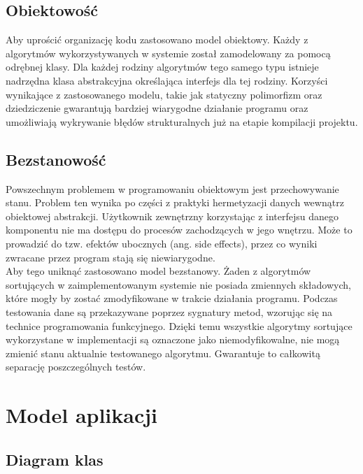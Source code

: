 \subsection{Obiektowość}
Aby uprościć organizację kodu zastosowano model obiektowy. Każdy z algorytmów wykorzystywanych w systemie
został zamodelowany za pomocą odrębnej klasy. Dla każdej rodziny algorytmów tego samego typu istnieje
nadrzędna klasa abstrakcyjna określająca interfejs dla tej rodziny. Korzyści wynikające z zastosowanego
modelu, takie jak statyczny polimorfizm oraz dziedziczenie gwarantują bardziej wiarygodne działanie programu
oraz umożliwiają wykrywanie błędów strukturalnych już na etapie kompilacji projektu.

\subsection{Bezstanowość}
Powszechnym problemem w programowaniu obiektowym jest przechowywanie stanu. Problem ten wynika po części
z praktyki hermetyzacji danych wewnątrz obiektowej abstrakcji. Użytkownik zewnętrzny korzystając z interfejsu
danego komponentu nie ma dostępu do procesów zachodzących w jego wnętrzu. Może to prowadzić do tzw. efektów
ubocznych (ang. side effects), przez co wyniki zwracane przez program stają się niewiarygodne.\\

Aby tego uniknąć zastosowano model bezstanowy. Żaden z algorytmów sortujących w zaimplementowanym systemie
nie posiada zmiennych składowych, które mogły by zostać zmodyfikowane w trakcie działania programu. Podczas
testowania dane są przekazywane poprzez sygnatury metod, wzorując się na technice programowania funkcyjnego.
Dzięki temu wszystkie algorytmy sortujące wykorzystane w implementacji są oznaczone jako niemodyfikowalne,
nie mogą zmienić stanu aktualnie testowanego algorytmu. Gwarantuje to całkowitą separację poszczególnych testów.

\section{Model aplikacji}

\subsection{Diagram klas}

\begin{figure}[H]
	\centering
	
\end{figure}

